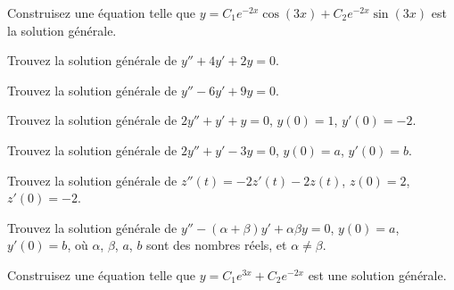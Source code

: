 \begin{exercise}
	Construisez une équation telle que $y = C_1 e^{-2x} \cos(3x) + C_2 e^{-2x}
	\sin(3x)$ est la solution générale.
\end{exercise}

\setcounter{exercise}{100}

\begin{exercise}
	Trouvez la solution générale de	$y''+4y'+2y=0$.
\end{exercise}

\begin{exercise}
	Trouvez la solution générale de $y''-6y'+9y=0$.
\end{exercise}

\begin{exercise}
	Trouvez la solution générale de	$2y''+y'+y=0$, $y(0) = 1$, $y'(0)=-2$.
\end{exercise}

\begin{exercise}
	Trouvez la solution générale de
	$2y''+y'-3y=0$, $y(0) = a$, $y'(0)=b$.
\end{exercise}

\begin{exercise}
	Trouvez la solution générale de
	$z''(t) = -2z'(t)-2z(t)$, $z(0) = 2$, $z'(0)= -2$.
\end{exercise}

\begin{exercise}
	Trouvez la solution générale de
	$y''-(\alpha+\beta) y' + \alpha \beta y=0$, $y(0) = a$, $y'(0)=b$,
	où $\alpha$, $\beta$, $a$, $b$ sont des nombres réels, et $\alpha \not=
	\beta$.
\end{exercise}

\begin{exercise}
	Construisez une équation telle que  $y = C_1 e^{3x} + C_2 e^{-2x}$ est une solution générale.  
\end{exercise}


